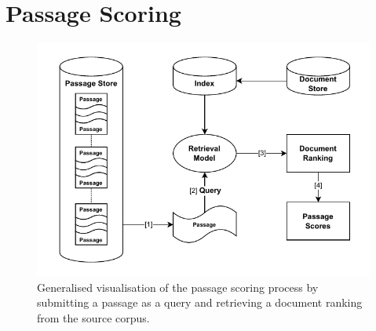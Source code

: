 \section{Passage Scoring}\label{passage-scoring}

\begin{figure}[t]
    \centering
    \includegraphics[width=\textwidth]{./graphics/drawio/passage_scoring.pdf}
    \caption{Generalised visualisation of the passage scoring process by submitting a passage as a query and retrieving a document ranking from the source corpus.}
    \label{fig:passage-scoring}
\end{figure}

